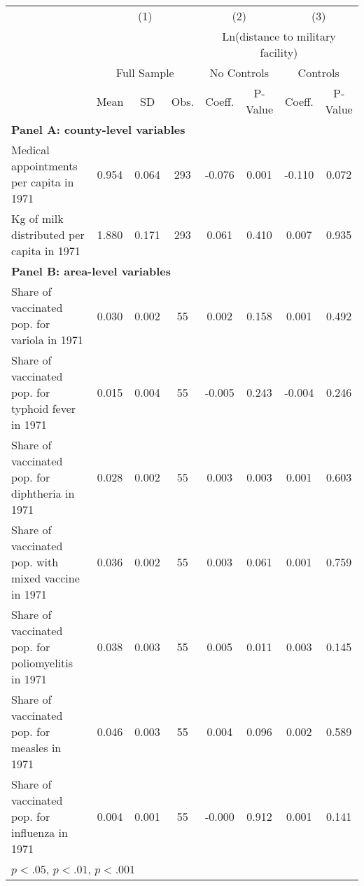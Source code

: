 
\begin{tabular}{l*{7}{c}}
\hline\hline
 & \multicolumn{3}{c}{(1)} & \multicolumn{2}{c}{(2)} & \multicolumn{2}{c}{(3)} \\
 & & & & \multicolumn{4}{c}{Ln(distance to military facility)} \\
 & \multicolumn{3}{c}{Full Sample} & \multicolumn{2}{c}{No Controls} & \multicolumn{2}{c}{Controls} \\
 & Mean & SD & Obs. & Coeff. & P-Value & Coeff. & P-Value \\
\hline
\multicolumn{8}{l}{\textbf{Panel A: county-level variables}} \\
\hline
Medical appointments per capita in 1971 &     0.954 &     0.064 & 293 &    -0.076 & 0.001\sym{***} &    -0.110 & 0.072  \\
Kg of milk distributed per capita in 1971 &     1.880 &     0.171 & 293 &     0.061 & 0.410  &     0.007 & 0.935  \\
\hline
\multicolumn{8}{l}{\textbf{Panel B: area-level variables}} \\
\hline
Share of vaccinated pop. for variola in 1971 &     0.030 &     0.002 & 55 &     0.002 & 0.158  &     0.001 & 0.492  \\
Share of vaccinated pop. for typhoid fever in 1971 &     0.015 &     0.004 & 55 &    -0.005 & 0.243  &    -0.004 & 0.246  \\
Share of vaccinated pop. for diphtheria in 1971 &     0.028 &     0.002 & 55 &     0.003 & 0.003\sym{**} &     0.001 & 0.603  \\
Share of vaccinated pop. with mixed vaccine in 1971 &     0.036 &     0.002 & 55 &     0.003 & 0.061  &     0.001 & 0.759  \\
Share of vaccinated pop. for poliomyelitis in 1971 &     0.038 &     0.003 & 55 &     0.005 & 0.011\sym{*} &     0.003 & 0.145  \\
Share of vaccinated pop. for measles in 1971 &     0.046 &     0.003 & 55 &     0.004 & 0.096  &     0.002 & 0.589  \\
Share of vaccinated pop. for influenza in 1971 &     0.004 &     0.001 & 55 &    -0.000 & 0.912  &     0.001 & 0.141  \\
\hline\hline
\multicolumn{8}{l}{\footnotesize \sym{*} \(p<.05\), \sym{**} \(p<.01\), \sym{***} \(p<.001\)}\\

\end{tabular}
